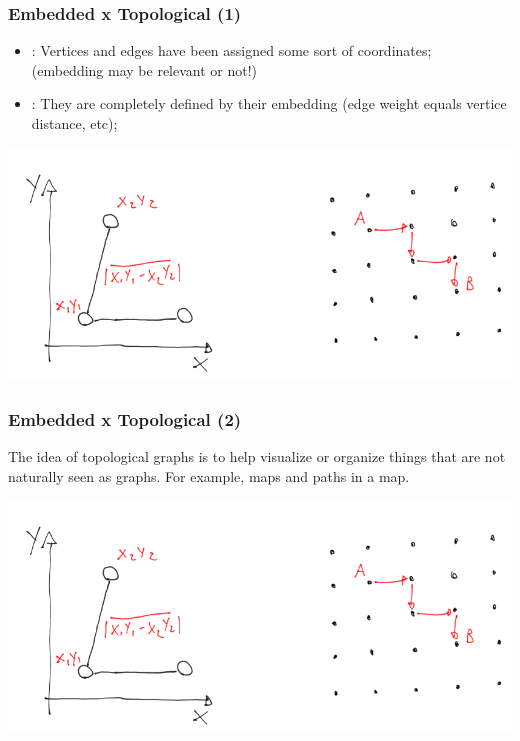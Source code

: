 \documentclass{beamer}
\begin{document}
\begin{frame}
  \frametitle{Embedded x Topological (1)}
  \begin{itemize}
    \item {}: Vertices and edges have been
      assigned some sort of coordinates;\\
      {\small \alert{(embedding may be relevant or not!)}}
    \item {}: They are completely defined
      by their embedding (edge weight equals vertice distance, etc);
  \end{itemize}
  \begin{center}
    \includegraphics[height=0.5\textheight]{img/topological}
  \end{center}
\end{frame}

\begin{frame}
  \frametitle{Embedded x Topological (2)}
  \begin{block}{}
    The idea of topological graphs is to help visualize or organize
    things that are not naturally seen as graphs. For example, maps
    and paths in a map.
  \end{block}
  \begin{center}
    \includegraphics[height=0.5\textheight]{img/topological}
  \end{center}
\end{frame}
\end{document}
